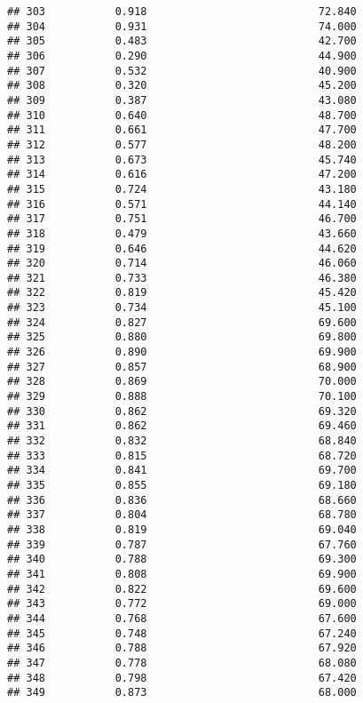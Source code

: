 \documentclass[
]{article}
\begin{document}
\begin{verbatim}
## 303           0.918                           72.840
## 304           0.931                           74.000
## 305           0.483                           42.700
## 306           0.290                           44.900
## 307           0.532                           40.900
## 308           0.320                           45.200
## 309           0.387                           43.080
## 310           0.640                           48.700
## 311           0.661                           47.700
## 312           0.577                           48.200
## 313           0.673                           45.740
## 314           0.616                           47.200
## 315           0.724                           43.180
## 316           0.571                           44.140
## 317           0.751                           46.700
## 318           0.479                           43.660
## 319           0.646                           44.620
## 320           0.714                           46.060
## 321           0.733                           46.380
## 322           0.819                           45.420
## 323           0.734                           45.100
## 324           0.827                           69.600
## 325           0.880                           69.800
## 326           0.890                           69.900
## 327           0.857                           68.900
## 328           0.869                           70.000
## 329           0.888                           70.100
## 330           0.862                           69.320
## 331           0.862                           69.460
## 332           0.832                           68.840
## 333           0.815                           68.720
## 334           0.841                           69.700
## 335           0.855                           69.180
## 336           0.836                           68.660
## 337           0.804                           68.780
## 338           0.819                           69.040
## 339           0.787                           67.760
## 340           0.788                           69.300
## 341           0.808                           69.900
## 342           0.822                           69.600
## 343           0.772                           69.000
## 344           0.768                           67.600
## 345           0.748                           67.240
## 346           0.788                           67.920
## 347           0.778                           68.080
## 348           0.798                           67.420
## 349           0.873                           68.000

\end{verbatim}
\end{document}
